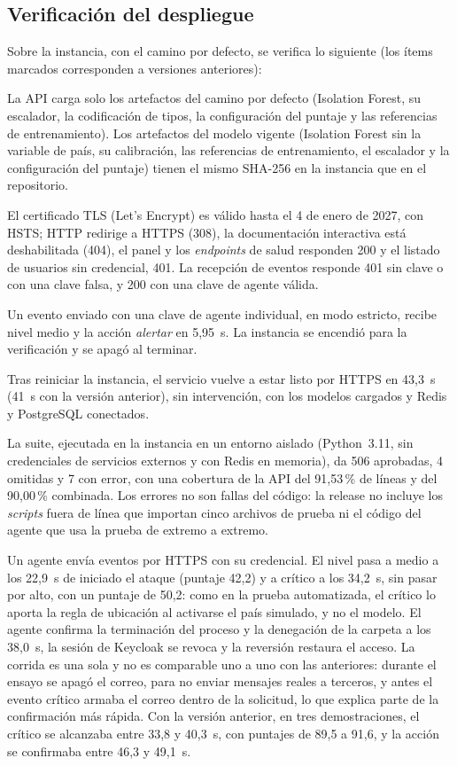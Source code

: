 \subsection{Verificación del despliegue}\label{sec:verificacion-despliegue}
Sobre la instancia, con el camino por defecto, se verifica lo siguiente (los ítems marcados corresponden a versiones anteriores):
\begin{description}[leftmargin=0pt, itemsep=2pt]
	\item[Modelos.] La API carga solo los artefactos del camino por defecto (Isolation Forest, su escalador, la codificación de tipos, la configuración del puntaje y las referencias de entrenamiento). Los artefactos del modelo vigente (Isolation Forest sin la variable de país, su calibración, las referencias de entrenamiento, el escalador y la configuración del puntaje) tienen el mismo SHA-256 en la instancia que en el repositorio.
	\item[Exposición.] El certificado TLS (Let's Encrypt) es válido hasta el 4 de enero de 2027, con HSTS; HTTP redirige a HTTPS (308), la documentación interactiva está deshabilitada (404), el panel y los \emph{endpoints} de salud responden 200 y el listado de usuarios sin credencial, 401. La recepción de eventos responde 401 sin clave o con una clave falsa, y 200 con una clave de agente válida.
	\item[Punta a punta.] Un evento enviado con una clave de agente individual, en modo estricto, recibe nivel medio y la acción \emph{alertar} en 5,95~s. La instancia se encendió para la verificación y se apagó al terminar.
	\item[Rearranque.] Tras reiniciar la instancia, el servicio vuelve a estar listo por HTTPS en 43,3~s (41~s con la versión anterior), sin intervención, con los modelos cargados y Redis y PostgreSQL conectados.
	\item[Pruebas.] La suite, ejecutada en la instancia en un entorno aislado (Python~3.11, sin credenciales de servicios externos y con Redis en memoria), da 506 aprobadas, 4 omitidas y 7 con error, con una cobertura de la API del 91,53\,\% de líneas y del 90,00\,\% combinada. Los errores no son fallas del código: la release no incluye los \emph{scripts} fuera de línea que importan cinco archivos de prueba ni el código del agente que usa la prueba de extremo a extremo.
	\item[Agente real.] Un agente envía eventos por HTTPS con su credencial. El nivel pasa a medio a los 22,9~s de iniciado el ataque (puntaje 42,2) y a crítico a los 34,2~s, sin pasar por alto, con un puntaje de 50,2: como en la prueba automatizada, el crítico lo aporta la regla de ubicación al activarse el país simulado, y no el modelo. El agente confirma la terminación del proceso y la denegación de la carpeta a los 38,0~s, la sesión de Keycloak se revoca y la reversión restaura el acceso. La corrida es una sola y no es comparable uno a uno con las anteriores: durante el ensayo se apagó el correo, para no enviar mensajes reales a terceros, y antes el evento crítico armaba el correo dentro de la solicitud, lo que explica parte de la confirmación más rápida. Con la versión anterior, en tres demostraciones, el crítico se alcanzaba entre 33,8 y 40,3~s, con puntajes de 89,5 a 91,6, y la acción se confirmaba entre 46,3 y 49,1~s.

\end{description}
